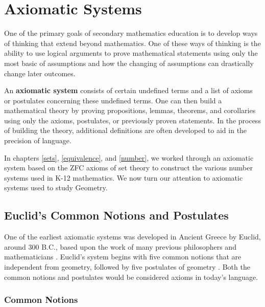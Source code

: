 \documentclass[
]{book}
\theoremstyle{definition}
\theoremstyle{definition}
\theoremstyle{definition}
\theoremstyle{definition}
\theoremstyle{remark}
\begin{document}
\hypertarget{axiomatic-systems}{%
\section{Axiomatic Systems}\label{axiomatic-systems}}

One of the primary goals of secondary mathematics education is to develop ways of thinking that extend beyond mathematics. One of these ways of thinking is the ability to use logical arguments to prove mathematical statements using only the most basic of assumptions and how the changing of assumptions can drastically change later outcomes.

An \textbf{axiomatic system} consists of certain undefined terms and a list of axioms or postulates concerning these undefined terms. One can then build a mathematical theory by proving propositions, lemmas, theorems, and corollaries using only the axioms, postulates, or previously proven statements. In the process of building the theory, additional definitions are often developed to aid in the precision of language.

In chapters \ref{sets}, \ref{equivalence}, and \ref{number}, we worked through an axiomatic system based on the ZFC axioms of set theory to construct the various number systems used in K-12 mathematics. We now turn our attention to axiomatic systems used to study Geometry.

\hypertarget{euclids-common-notions-and-postulates}{%
\subsection{Euclid's Common Notions and Postulates}\label{euclids-common-notions-and-postulates}}

One of the earliest axiomatic systems was developed in Ancient Greece by Euclid, around 300 B.C., based upon the work of many previous philosophers and mathematicians \citep{Heath1908_1}. Euclid's system begins with five common notions that are independent from geometry, followed by five postulates of geometry \citep[p.~154-155]{Heath1908_1}. Both the common notions and postulates would be considered axioms in today's language.

\hypertarget{common-notions}{%
\subsubsection*{Common Notions}\label{common-notions}}
\end{document}
